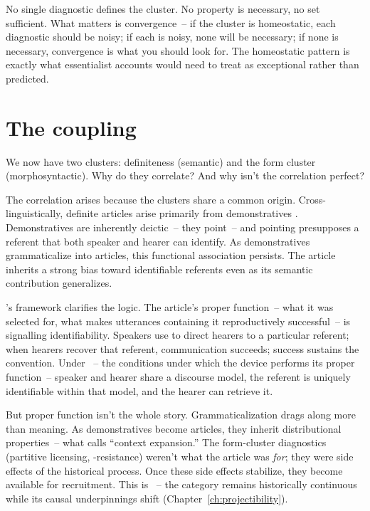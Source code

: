 No single diagnostic defines the cluster. No property is necessary, no set sufficient. What matters is convergence~-- if the cluster is homeostatic, each diagnostic should be noisy; if each is noisy, none will be necessary; if none is necessary, convergence is what you should look for. The homeostatic pattern is exactly what essentialist accounts would need to treat as exceptional rather than predicted.

\section{The coupling}
\label{sec:10:coupling}

We now have two clusters: definiteness (semantic) and the form cluster (morphosyntactic). Why do they correlate? And why isn't the correlation perfect?

The correlation arises because the clusters share a common origin. Cross-linguistically, definite articles arise primarily from demonstratives \citep{diessel1999,greenberg1978}. Demonstratives are inherently deictic~-- they point~-- and pointing presupposes a referent that both speaker and hearer can identify. As demonstratives grammaticalize into articles, this functional association persists. The article inherits a strong bias toward identifiable referents even as its semantic contribution generalizes.

\textcite{millikan1984}'s  framework clarifies the logic. The article's proper function~-- what it was selected for, what makes utterances containing it reproductively successful~-- is signalling identifiability. Speakers use  to direct hearers to a particular referent; when hearers recover that referent, communication succeeds; success sustains the convention. Under ~-- the conditions under which the device performs its proper function~-- speaker and hearer share a discourse model, the referent is uniquely identifiable within that model, and the hearer can retrieve it.

But proper function isn't the whole story. Grammaticalization drags along more than meaning. As demonstratives become articles, they inherit distributional properties~-- what \textcite{himmelmann1997} calls \enquote{context expansion.} The form-cluster diagnostics (partitive licensing, -resistance) weren't what the article was \emph{for}; they were side effects of the historical process. Once these side effects stabilize, they become available for recruitment. This is ~-- the category remains historically continuous while its causal underpinnings shift (Chapter~\ref{ch:projectibility}).

